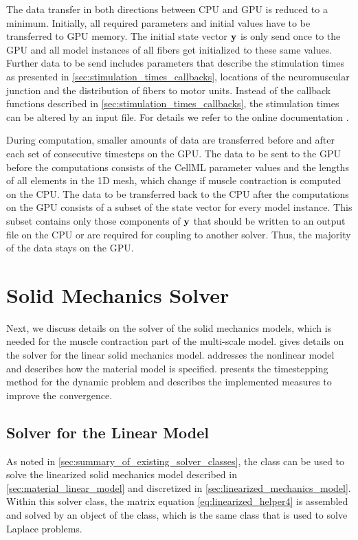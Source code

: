 The data transfer in both directions between CPU and GPU is reduced to a minimum. Initially, all required parameters and initial values have to be transferred to GPU memory. The initial state vector $\textbf{y}$ is only send once to the GPU and all model instances of all fibers get initialized to these same values. Further data to be send includes parameters that describe the stimulation times as presented in \cref{sec:stimulation_times_callbacks}, locations of the neuromuscular junction and the distribution of fibers to motor units. Instead of the callback functions described in \cref{sec:stimulation_times_callbacks}, the stimulation times can be altered by an input file. For details we refer to the online documentation \cite{opendihuWeb}.

During computation, smaller amounts of data are transferred before and after each set of consecutive timesteps on the GPU. The data to be sent to the GPU before the computations consists of the CellML parameter values and the lengths of all elements in the 1D mesh, which change if muscle contraction is computed on the CPU. The data to be transferred back to the CPU after the computations on the GPU consists of a subset of the state vector for every model instance. This subset contains only those components of $\textbf{y}$ that should be written to an output file on the CPU or are required for coupling to another solver. Thus, the majority of the data stays on the GPU.


\section{Solid Mechanics Solver}\label{sec:solid_mechanics_solver}
Next, we discuss details on the solver of the solid mechanics models, which is needed for the muscle contraction part of the multi-scale model.
 gives details on the solver for the linear solid mechanics model.  addresses the nonlinear model and describes how the material model is specified.  presents the timestepping method for the dynamic problem and describes the implemented measures to improve the convergence.

\subsection{Solver for the Linear Model}\label{sec:solver_linear_model_elasticity}
As noted in \cref{sec:summary_of_existing_solver_classes}, the  class can be used to solve the linearized solid mechanics model described in \cref{sec:material_linear_model} and discretized in \cref{sec:linearized_mechanics_model}. 
Within this solver class, the matrix equation \cref{eq:linearized_helper4} is assembled and solved by an object of the  class, which is the same class that is used to solve  Laplace problems.

